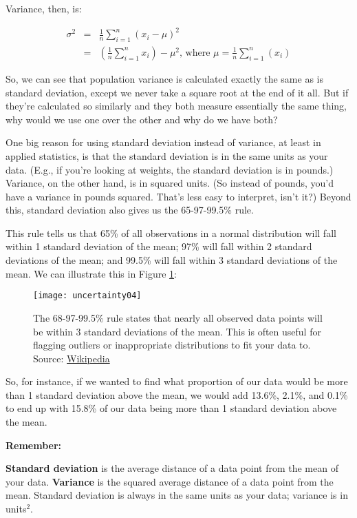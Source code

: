 Variance, then, is:

\begin{eqnarray*}
	\sigma^2 &=& \frac{1}{n}\sum_{i=1}^n\left(x_i-\mu\right)^2 \\
	&=& \left(\frac{1}{n}\sum_{i=1}^nx_i\right)-\mu^2\text{, where } \mu=\frac{1}{n}\sum_{i=1}^n(x_i)
\end{eqnarray*}

So, we can see that population variance is calculated exactly the same as is standard deviation, except we never take a square root at the end of it all. But if they're calculated so similarly and they both measure essentially the same thing, why would we use one over the other and why do we have both?

One big reason for using standard deviation instead of variance, at least in applied statistics, is that the standard deviation is in the same units as your data. (E.g., if you're looking at weights, the standard deviation is in pounds.) Variance, on the other hand, is in squared units. (So instead of pounds, you'd have a variance in pounds squared. That's less easy to interpret, isn't it?) Beyond this, standard deviation also gives us the 65-97-99.5\% rule.

This rule tells us that 65\% of all observations in a normal distribution will fall within 1 standard deviation of the mean; 97\% will fall within 2 standard deviations of the mean; and 99.5\% will fall within 3 standard deviations of the mean. We can illustrate this in Figure \ref{fig:uncertainty04}:

\begin{figure}[h]
\texttt{[image: uncertainty04]}
\caption{The 68-97-99.5\% rule states that nearly all observed data points will be within 3 standard deviations of the mean. This is often useful for flagging outliers or inappropriate distributions to fit your data to. Source: \href{http://en.wikipedia.org/wiki/Standard_deviation}{Wikipedia}}
\label{fig:uncertainty04}
\end{figure}

So, for instance, if we wanted to find what proportion of our data would be more than 1 standard deviation above the mean, we would add 13.6\%, 2.1\%, and 0.1\% to end up with 15.8\% of our data being more than 1 standard deviation above the mean.

\begin{framed}
\noindent \textbf{{\large Remember:}}

\textbf{Standard deviation} is the average distance of a data point from the mean of your data. \textbf{Variance} is the squared average distance of a data point from the mean. Standard deviation is always in the same units as your data; variance is in units\(^2\).
\end{framed}

